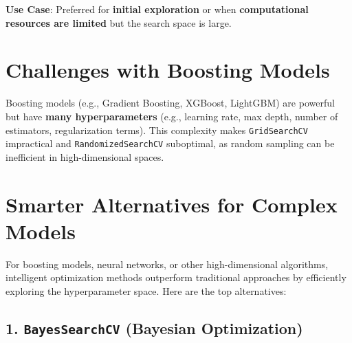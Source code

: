 \documentclass[
  letterpaper,
  DIV=11,
  numbers=noendperiod]{scrreprt}
\begin{document}
\textbf{Use Case}: Preferred for \textbf{initial exploration} or when
\textbf{computational resources are limited} but the search space is
large.

\section{Challenges with Boosting
Models}\label{challenges-with-boosting-models}

Boosting models (e.g., Gradient Boosting, XGBoost, LightGBM) are
powerful but have \textbf{many hyperparameters} (e.g., learning rate,
max depth, number of estimators, regularization terms). This complexity
makes \texttt{GridSearchCV} impractical and \texttt{RandomizedSearchCV}
suboptimal, as random sampling can be inefficient in high-dimensional
spaces.

\section{Smarter Alternatives for Complex
Models}\label{smarter-alternatives-for-complex-models}

For boosting models, neural networks, or other high-dimensional
algorithms, intelligent optimization methods outperform traditional
approaches by efficiently exploring the hyperparameter space. Here are
the top alternatives:

\subsection{\texorpdfstring{1. \texttt{BayesSearchCV} (Bayesian
Optimization)}{1. BayesSearchCV (Bayesian Optimization)}}\label{bayessearchcv-bayesian-optimization}
\end{document}
